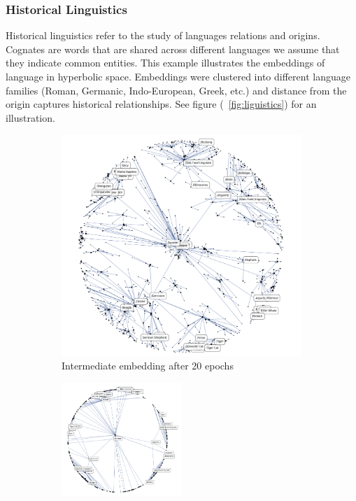 \subsubsection{Historical Linguistics}
Historical linguistics refer to the study of languages relations and origins. Cognates are words that are shared across different languages we assume that they indicate common entities. This example illustrates the embeddings of language in hyperbolic space. Embeddings were clustered into different language families (Roman, Germanic, Indo-European, Greek, etc.) and distance from the origin captures historical relationships. See figure  (~\ref{fig:liguistics}) for an illustration.
\begin{figure}[htb]
    \begin{center}
    \begin{adjustbox}{minipage=0.5\textwidth,scale=0.5}
    \begin{subfigure}[b]{\columnwidth}
        \includegraphics[width=\textwidth]{lectures/11-b/Images/1-4.png}
            \caption{Intermediate embedding after 20 epochs}
            \label{fig:linguistics1}
        \vspace{0.7cm}
        \end{subfigure}
        \begin{subfigure}[b]{\columnwidth}
            \includegraphics[width=0.5\textwidth]{lectures/11-b/Images/1-5.png}

\end{subfigure}
\end{adjustbox}
\end{center}
\end{figure}
